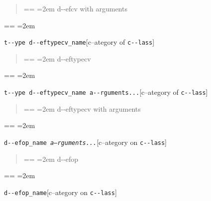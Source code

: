 \documentclass{book}
\makeatletter
\newenvironment{GNUTexinfopreformatted}{%
  \par\obeylines\obeyspaces\frenchspacing
  \parskip=\z@\parindent=\z@}{}
\makeatother
\begin{document}
%
\begin{quote}
\unskip{\parskip=0pt\noindent}%
\begin{GNUTexinfopreformatted}
\leftskip=2em\relax\ttfamily%
d{-}{-}efcv with arguments
\end{GNUTexinfopreformatted}
\end{quote}
\begin{GNUTexinfopreformatted}
\leftskip=2em\relax\ttfamily%

\end{GNUTexinfopreformatted}
\noindent\texttt{t{-}{-}ype d{-}{-}eftypecv\_name}\hfill[c--ategory of \texttt{c{-}{-}lass}]



%
\begin{quote}
\unskip{\parskip=0pt\noindent}%
\begin{GNUTexinfopreformatted}
\leftskip=2em\relax\ttfamily%
d{-}{-}eftypecv
\end{GNUTexinfopreformatted}
\end{quote}
\begin{GNUTexinfopreformatted}
\leftskip=2em\relax\ttfamily%

\end{GNUTexinfopreformatted}
\noindent\texttt{t{-}{-}ype d{-}{-}eftypecv\_name a{-}{-}rguments...}\hfill[c--ategory of \texttt{c{-}{-}lass}]



%
\begin{quote}
\unskip{\parskip=0pt\noindent}%
\begin{GNUTexinfopreformatted}
\leftskip=2em\relax\ttfamily%
d{-}{-}eftypecv with arguments
\end{GNUTexinfopreformatted}
\end{quote}
\begin{GNUTexinfopreformatted}
\leftskip=2em\relax\ttfamily%

\end{GNUTexinfopreformatted}
\noindent\texttt{d{-}{-}efop\_name \EmbracOn{}\textnormal{\textsl{a--rguments...}}\EmbracOff{}}\hfill[c--ategory on \texttt{c{-}{-}lass}]



%
\begin{quote}
\unskip{\parskip=0pt\noindent}%
\begin{GNUTexinfopreformatted}
\leftskip=2em\relax\ttfamily%
d{-}{-}efop
\end{GNUTexinfopreformatted}
\end{quote}
\begin{GNUTexinfopreformatted}
\leftskip=2em\relax\ttfamily%

\end{GNUTexinfopreformatted}
\noindent\texttt{d{-}{-}efop\_name}\hfill[c--ategory on \texttt{c{-}{-}lass}]
\end{document}
